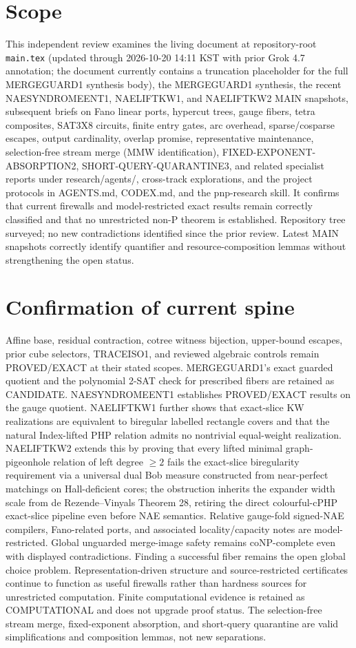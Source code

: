 \documentclass[11pt]{article}
\begin{document}
\section{Scope}
This independent review examines the living document at repository-root \texttt{main.tex} (updated through 2026-10-20 14:11 KST with prior Grok 4.7 annotation; the document currently contains a truncation placeholder for the full MERGEGUARD1 synthesis body), the MERGEGUARD1 synthesis, the recent NAESYNDROMEENT1, NAELIFTKW1, and NAELIFTKW2 MAIN snapshots, subsequent briefs on Fano linear ports, hypercut trees, gauge fibers, tetra composites, SAT3X8 circuits, finite entry gates, arc overhead, sparse/cosparse escapes, output cardinality, overlap promise, representative maintenance, selection-free stream merge (MMW identification), FIXED-EXPONENT-ABSORPTION2, SHORT-QUERY-QUARANTINE3, and related specialist reports under research/agents/, cross-track explorations, and the project protocols in AGENTS.md, CODEX.md, and the pnp-research skill. It confirms that current firewalls and model-restricted exact results remain correctly classified and that no unrestricted non-P theorem is established. Repository tree surveyed; no new contradictions identified since the prior review. Latest MAIN snapshots correctly identify quantifier and resource-composition lemmas without strengthening the open status.

\section{Confirmation of current spine}
Affine base, residual contraction, cotree witness bijection, upper-bound escapes, prior cube selectors, TRACEISO1, and reviewed algebraic controls remain PROVED/EXACT at their stated scopes. MERGEGUARD1's exact guarded quotient and the polynomial 2-SAT check for prescribed fibers are retained as CANDIDATE. NAESYNDROMEENT1 establishes PROVED/EXACT results on the gauge quotient. NAELIFTKW1 further shows that exact-slice KW realizations are equivalent to biregular labelled rectangle covers and that the natural Index-lifted PHP relation admits no nontrivial equal-weight realization. NAELIFTKW2 extends this by proving that every lifted minimal graph-pigeonhole relation of left degree $\ge 2$ fails the exact-slice biregularity requirement via a universal dual Bob measure constructed from near-perfect matchings on Hall-deficient cores; the obstruction inherits the expander width scale from de Rezende--Vinyals Theorem 28, retiring the direct colourful-cPHP exact-slice pipeline even before NAE semantics. Relative gauge-fold signed-NAE compilers, Fano-related ports, and associated locality/capacity notes are model-restricted. Global unguarded merge-image safety remains coNP-complete even with displayed contradictions. Finding a successful fiber remains the open global choice problem. Representation-driven structure and source-restricted certificates continue to function as useful firewalls rather than hardness sources for unrestricted computation. Finite computational evidence is retained as COMPUTATIONAL and does not upgrade proof status. The selection-free stream merge, fixed-exponent absorption, and short-query quarantine are valid simplifications and composition lemmas, not new separations.
\end{document}

